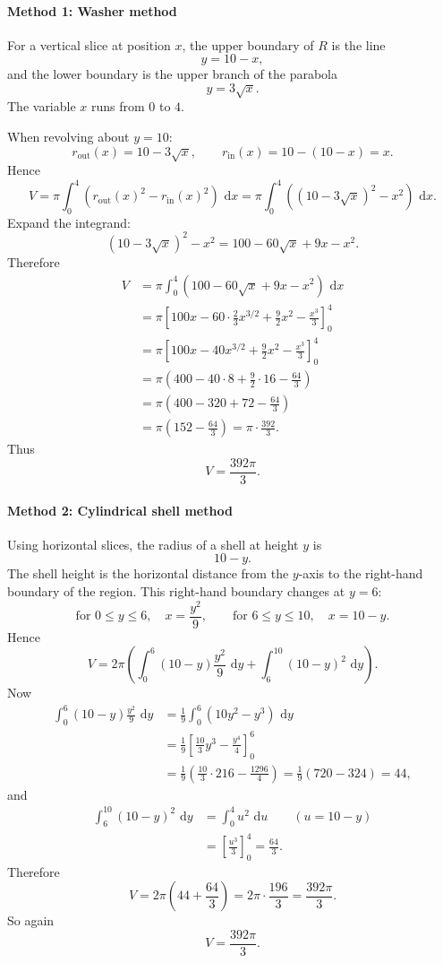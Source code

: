 \documentclass[12pt]{article}
\newcommand{\dd}{\,\mathrm{d}}
\begin{document}
\paragraph{Method 1: Washer method}
For a vertical slice at position \(x\), the upper boundary of \(R\) is the line
\[
y=10-x,
\]
and the lower boundary is the upper branch of the parabola
\[
y=3\sqrt{x}.
\]
The variable \(x\) runs from \(0\) to \(4\).

When revolving about \(y=10\):
\[
r_{\text{out}}(x)=10-3\sqrt{x},
\qquad
r_{\text{in}}(x)=10-(10-x)=x.
\]
Hence
\[
V=\pi\int_{0}^{4}\left(r_{\text{out}}(x)^2-r_{\text{in}}(x)^2\right)\,\dd x
=\pi\int_{0}^{4}\left((10-3\sqrt{x})^2-x^2\right)\,\dd x.
\]
Expand the integrand:
\[
(10-3\sqrt{x})^2-x^2=100-60\sqrt{x}+9x-x^2.
\]
Therefore
\begin{align*}
V
&=\pi\int_{0}^{4}\left(100-60\sqrt{x}+9x-x^2\right)\,\dd x \\
&=\pi\left[100x-60\cdot \frac{2}{3}x^{3/2}+\frac{9}{2}x^2-\frac{x^3}{3}\right]_{0}^{4} \\
&=\pi\left[100x-40x^{3/2}+\frac{9}{2}x^2-\frac{x^3}{3}\right]_{0}^{4} \\
&=\pi\left(400-40\cdot 8+\frac{9}{2}\cdot 16-\frac{64}{3}\right) \\
&=\pi\left(400-320+72-\frac{64}{3}\right) \\
&=\pi\left(152-\frac{64}{3}\right)
=\pi\cdot \frac{392}{3}.
\end{align*}
Thus
\[
\boxed{V=\frac{392\pi}{3}.}
\]

\paragraph{Method 2: Cylindrical shell method}
Using horizontal slices, the radius of a shell at height \(y\) is
\[
10-y.
\]
The shell height is the horizontal distance from the \(y\)-axis to the right-hand boundary of the region.
This right-hand boundary changes at \(y=6\):
\[
\text{for }0\le y\le 6,\quad x=\frac{y^2}{9},
\qquad
\text{for }6\le y\le 10,\quad x=10-y.
\]
Hence
\[
V=2\pi\left(\int_{0}^{6}(10-y)\frac{y^2}{9}\,\dd y+\int_{6}^{10}(10-y)^2\,\dd y\right).
\]
Now
\begin{align*}
\int_{0}^{6}(10-y)\frac{y^2}{9}\,\dd y
&=\frac{1}{9}\int_{0}^{6}(10y^2-y^3)\,\dd y \\
&=\frac{1}{9}\left[\frac{10}{3}y^3-\frac{y^4}{4}\right]_{0}^{6} \\
&=\frac{1}{9}\left(\frac{10}{3}\cdot 216-\frac{1296}{4}\right)
=\frac{1}{9}(720-324)=44,
\end{align*}
and
\begin{align*}
\int_{6}^{10}(10-y)^2\,\dd y
&=\int_{0}^{4}u^2\,\dd u \qquad (u=10-y) \\
&=\left[\frac{u^3}{3}\right]_{0}^{4}
=\frac{64}{3}.
\end{align*}
Therefore
\[
V=2\pi\left(44+\frac{64}{3}\right)=2\pi\cdot \frac{196}{3}=\frac{392\pi}{3}.
\]
So again
\[
\boxed{V=\frac{392\pi}{3}.}
\]
\end{document}
